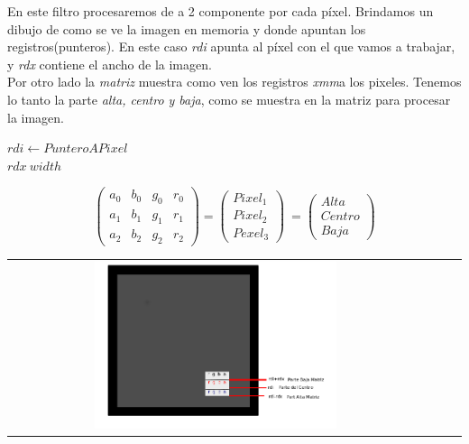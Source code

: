 \begin{multicols}{2}
En este filtro procesaremos de a 2 componente por cada píxel.
Brindamos un dibujo de como se ve la imagen en memoria y donde apuntan los registros(punteros).
En este caso \emph{rdi} apunta al píxel con el que vamos a trabajar, y \emph{rdx} contiene el ancho de la imagen. \\
Por otro lado la \emph{matriz} muestra como ven los registros \emph{xmm}a los pixeles. Tenemos lo tanto la parte  \emph{alta, centro y baja},
como se muestra en la matriz para procesar la imagen.
\begin{center}
		$rdi \gets PunteroAPixel$ \\
		$rdx \ width$
\end{center}

\begin{center}
\[ \left( \begin{array}{cccc}
 a_0 & b_0 & g_0 & r_0 \\ 
 a_1 & b_1 & g_1 & r_1 \\
 a_2 & b_2 & g_2 & r_2
\end{array} \right) = \left( \begin{array}{cccc}
 Pixel_1 \\ 
 Pixel_2 \\
 Pexel_3
\end{array} \right)\ = \left( \begin{array}{cccc}
 Alta \\ 
 Centro \\
 Baja
\end{array} \right)\] 

\end{center}



    \begin{center}
	    \begin{tabular}{cccc}
		  \includegraphics[width=0.6\textwidth]{imagenes/edge/edge1.png} \\
		\end{tabular}
	\end{center}


\end{multicols}



